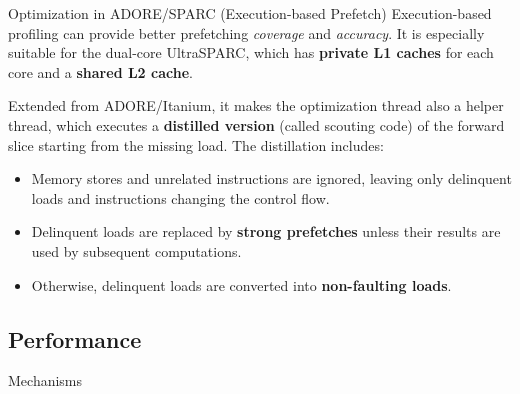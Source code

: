 \documentclass[aspectratio=169,xcolor=x11names]{beamer}
\begin{document}
	\begin{frame}{Optimization in ADORE/SPARC (Execution-based Prefetch)}
		\alert{Execution-based profiling} can provide better prefetching \textit{coverage} and \textit{accuracy}. It is especially suitable for the dual-core UltraSPARC, which has \textbf{private L1 caches} for each core and a \textbf{shared L2 cache}.
		
		Extended from ADORE/Itanium, it makes the optimization thread also a \alert{helper thread}, which executes a \textbf{distilled version} (called \alert{scouting code}) of the forward slice starting from the missing load. The distillation includes:
		\begin{itemize}
			\item Memory stores and unrelated instructions are ignored, leaving only delinquent loads and instructions changing the control flow.
			\item Delinquent loads are replaced by \textbf{strong prefetches} unless their results are used by subsequent computations.
			\item Otherwise, delinquent loads are converted into \textbf{non-faulting loads}.
		\end{itemize}
	\end{frame}

	\subsection{Performance}
	\begin{frame}{Mechanisms}
	\end{frame}
\end{document}
